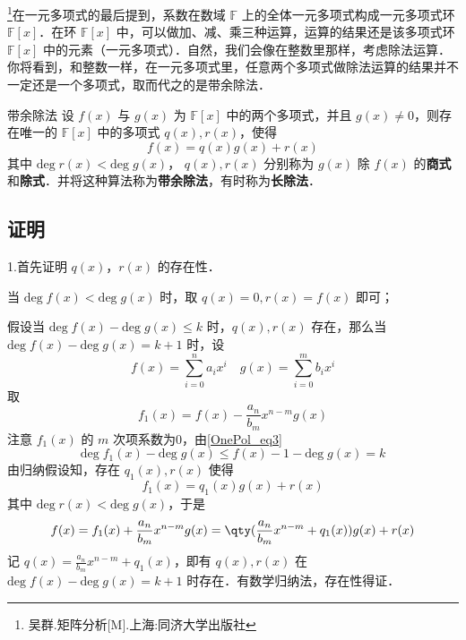
\begin{issues}
\end{issues}

\footnote{吴群.矩阵分析[M].上海:同济大学出版社}在一元多项式的最后提到，系数在数域 $\mathbb{F}$ 上的全体一元多项式构成一元多项式环 $\mathbb{F}[x]$．在环 $\mathbb{F}[x]$ 中，可以做加、减、乘三种运算，运算的结果还是该多项式环 $\mathbb{F}[x]$ 中的元素（一元多项式）．自然，我们会像在整数里那样，考虑除法运算．你将看到，和整数一样，在一元多项式里，任意两个多项式做除法运算的结果并不一定还是一个多项式，取而代之的是带余除法．
\begin{theorem}{带余除法}\label{DivAlg_the1}
设 $f(x)$ 与 $g(x)$ 为 $\mathbb{F}[x]$ 中的两个多项式，并且 $g(x)\neq 0$，则存在唯一的 $\mathbb{F}[x]$ 中的多项式 $q(x),r(x)$，使得
\begin{equation}
f(x)=q(x)g(x)+r(x)
\end{equation}
其中 $\mathrm{deg}\;r(x)<\mathrm{deg}\;g(x)$， $q(x),r(x)$ 分别称为 $g(x)$ 除 $f(x)$ 的\textbf{商式}和\textbf{除式}．并将这种算法称为\textbf{带余除法}，有时称为\textbf{长除法}．
\end{theorem}
\subsection{证明}
1.首先证明 $q(x)$，$r(x)$ 的存在性．

当 $\mathrm{deg}\;f(x)<\mathrm{deg}\;g(x)$ 时，取 $q(x)=0,r(x)=f(x)$ 即可；

假设当 $\mathrm{deg}\;f(x)-\mathrm{deg}\;g(x)\leq k$ 时，$q(x),r(x)$ 存在，那么当 $\mathrm{deg}\;f(x)-\mathrm{deg}\;g(x)=k+1$ 时，设
\begin{equation}
f(x)=\sum_{i=0}^n a_i x^i\quad g(x)=\sum_{i=0}^m b_ix^i
\end{equation}
取
\begin{equation}
f_1(x)=f(x)-\frac{a_n}{b_m}x^{n-m}g(x)
\end{equation}
注意 $f_1(x)$ 的 $m$ 次项系数为0，由\autoref{OnePol_eq3}~
\begin{equation}
\mathrm{deg}\;f_1(x)-\mathrm{deg}\;g(x)\leq f(x)-1-\mathrm{deg}\;g(x)=k
\end{equation}
由归纳假设知，存在 $q_1(x),r(x)$ 使得
\begin{equation}
f_1(x)=q_1(x)g(x)+r(x)
\end{equation}
其中 $\mathrm{deg}\;r(x)<\mathrm{deg}\;g(x)$，于是
\begin{equation}
f(x)=f_1(x)+\frac{a_n}{b_m}x^{n-m}g(x)=\qty(\frac{a_n}{b_m}x^{n-m}+q_1(x))g(x)+r(x)
\end{equation}
记 $q(x)=\frac{a_n}{b_m}x^{n-m}+q_1(x)$，即有 $q(x),r(x)$ 在 $\mathrm{deg}\;f(x)-\mathrm{deg}\;g(x)=k+1$ 时存在．有数学归纳法，存在性得证．

